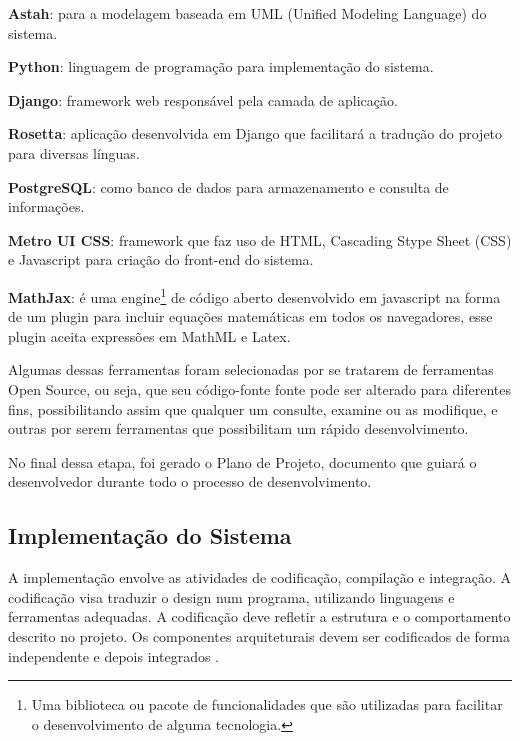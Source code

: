 \begin{alineas}
	\item \textbf{Astah}: para a modelagem baseada em UML (Unified Modeling Language) do sistema.
	\item \textbf{Python}: linguagem de programação para implementação do sistema.
    \item \textbf{Django}: framework web responsável pela camada de aplicação.
    \item \textbf{Rosetta}: aplicação desenvolvida em Django que facilitará a tradução do projeto para diversas línguas.  
    \item \textbf{PostgreSQL}: como banco de dados para armazenamento e consulta de informações.
    \item \textbf{Metro UI CSS}: framework que faz uso de HTML, Cascading Stype Sheet (CSS) e Javascript para criação do front-end do sistema.
    \item \textbf{MathJax}: \'e uma engine\footnote{Uma biblioteca ou pacote de funcionalidades que são utilizadas para facilitar o desenvolvimento de alguma tecnologia.} de código aberto 
desenvolvido em 
javascript na forma de um plugin para incluir equações matemáticas em todos os navegadores, esse plugin aceita expressões em  MathML e Latex.

\end{alineas}

Algumas dessas ferramentas foram selecionadas por se tratarem de ferramentas Open Source, ou seja, que seu código-fonte fonte pode ser alterado para diferentes fins, possibilitando assim 
que qualquer um consulte, examine ou as modifique, e outras por serem ferramentas que possibilitam um rápido desenvolvimento.

No final dessa etapa, foi gerado o Plano de Projeto, documento que guiar\'a o desenvolvedor durante 
todo o processo de desenvolvimento.

\subsection{Implementação do Sistema}

A implementação envolve as atividades de codificação, compilação e integração. A codificação visa traduzir o design num programa, utilizando linguagens e  ferramentas adequadas. A codificação 
deve refletir a estrutura e o comportamento descrito no projeto. Os componentes arquiteturais devem ser codificados de forma independente e depois integrados \cite{aguiar2012requisitos}.

